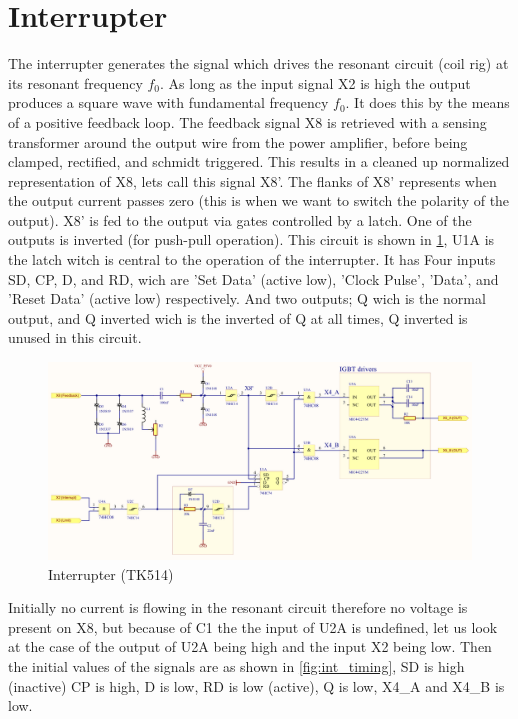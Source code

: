 \section{Interrupter}
\label{sec:interrupter}

The interrupter generates the signal which drives the resonant circuit (coil rig) at its resonant frequency $f_0$. As long as the input signal X2 is high the output produces a square wave with fundamental frequency $f_0$. It does this by the means of a positive feedback loop. The feedback signal X8 is retrieved with a sensing transformer around the output wire from the power amplifier, before being clamped, rectified, and schmidt triggered. This results in a cleaned up normalized representation of X8, lets call this signal X8'. The flanks of X8' represents when the output current passes zero (this is when we want to switch the polarity of the output). X8' is fed to the output via gates controlled by a latch. One of the outputs is inverted (for push-pull operation). This circuit is shown in \cref{fig:interrupter}, U1A is the latch witch is central to the operation of the interrupter. It has Four inputs SD, CP, D, and RD, wich are 'Set Data' (active low), 'Clock Pulse', 'Data', and 'Reset Data' (active low) respectively. And two outputs; Q wich is the normal output, and Q inverted wich is the inverted of Q at all times, Q inverted is unused in this circuit.

\begin{figure}[h!]
    \centering
    \includegraphics[width=0.9\textheight,angle=-90]{Skjema/TK514_Interrupter.pdf}
    \caption{Interrupter (TK514)}
    \label{fig:interrupter}
\end{figure}

\newpage

Initially no current is flowing in the resonant circuit therefore no voltage is present on X8, but because of C1 the the input of U2A is undefined, let us look at the case of the output of U2A being high and the input X2 being low. Then the initial values of the signals are as shown in \cref{fig:int_timing}, SD is high (inactive) CP is high, D is low, RD is low (active), Q is low, X4\_A and X4\_B is low.

